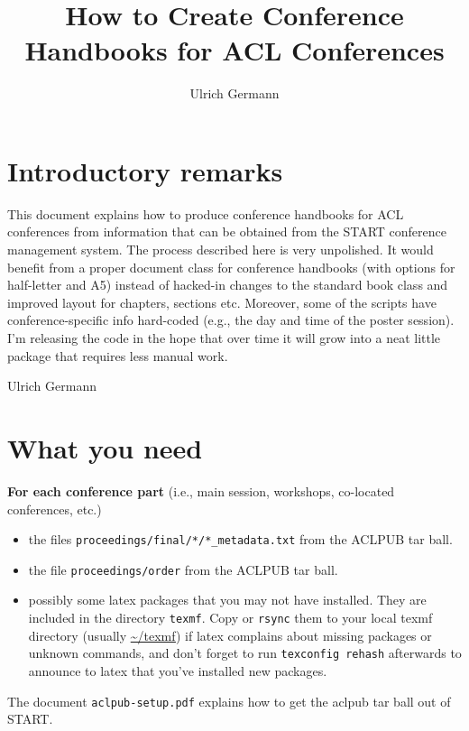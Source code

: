 \documentclass{article}
\title{How to Create Conference Handbooks for ACL Conferences}
\author{Ulrich Germann}
\begin{document}
\maketitle
\section{Introductory remarks}
This document explains how to produce conference handbooks for ACL
conferences from information that can be obtained from the START
conference management system. The process described here is very
unpolished. It would benefit from a proper document class for
conference handbooks (with options for half-letter and A5) instead of
hacked-in changes to the standard book class and improved layout for
chapters, sections etc. Moreover, some of the scripts have
conference-specific info hard-coded (e.g., the day and time of the
poster session). I'm releasing the code in the hope that over time it
will grow into a neat little package that requires less manual work.

\begin{flushright}
Ulrich Germann
\end{flushright}

\section{What you need}
{\bfseries For each conference part} (i.e., main session, workshops, co-located conferences, etc.)
\begin{itemize}
\item the files \verb$proceedings/final/*/*_metadata.txt$ from the ACLPUB tar ball.
\item the file {\tt proceedings/order} from the ACLPUB tar ball.
\item possibly some latex packages that you may not have
  installed. They are included in the directory {\tt texmf}. Copy or
  {\tt rsync} them to your local texmf directory (usually
  \url{~/texmf}) if latex complains about missing packages or unknown
  commands, and don't forget to run {\tt texconfig rehash} afterwards
  to announce to latex that you've installed new packages.
\end{itemize}

The document {\tt aclpub-setup.pdf} explains
how to get the aclpub tar ball out of START.
\end{document}
